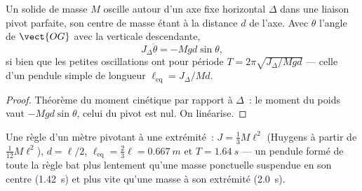 \begin{proposition}\label{prop:b2:rigid-body-mechanics:pendulum}
Un solide de masse $M$ oscille autour d'un axe fixe horizontal $\Delta$ dans une
liaison pivot parfaite, son centre de masse étant à la distance $d$ de l'axe. Avec
$\theta$ l'angle de $\vect{OG}$ avec la verticale descendante,
\[
J_\Delta\ddot\theta = -Mgd\sin\theta ,
\]
si bien que les petites oscillations ont pour période $T = 2\pi\sqrt{J_\Delta/Mgd}$
--- celle d'un pendule simple de longueur $\ell_{\text{eq}} = J_\Delta/Md$.
\end{proposition}

\begin{proof}
Théorème du moment cinétique par rapport à $\Delta$~: le moment du poids vaut
$-Mgd\sin\theta$, celui du pivot est nul. On linéarise.
\end{proof}

\begin{example}\label{ex:b2:rigid-body-mechanics:rule}
Une règle d'un mètre pivotant à une extrémité~: $J = \tfrac13M\ell^2$ (Huygens à partir de
$\tfrac1{12}M\ell^2$), $d = \ell/2$, $\ell_{\text{eq}} = \tfrac23\ell =
\qty{0.667}{m}$ et $T = \qty{1.64}{s}$ --- un pendule formé de toute la règle bat
plus lentement qu'une masse ponctuelle suspendue en son centre (\qty{1.42}{s}) et plus vite
qu'une masse à son extrémité (\qty{2.0}{s}).
\end{example}

